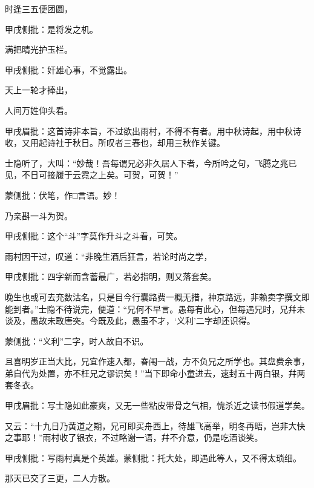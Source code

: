 \begin{poem}
    \begin{pl}时逢三五便团圆，\end{pl}\begin{note}甲戌侧批：是将发之机。\end{note}

    \begin{pl}满把晴光护玉栏。\end{pl}\begin{note}甲戌侧批：奸雄心事，不觉露出。\end{note}

    \begin{pl}天上一轮才捧出，\end{pl}

    \begin{pl}人间万姓仰头看。\end{pl}\begin{note}甲戌眉批：这首诗非本旨，不过欲出雨村，不得不有者。用中秋诗起，用中秋诗收，又用起诗社于秋日。所叹者三春也，却用三秋作关键。\end{note}
\end{poem}


\begin{parag}
    士隐听了，大叫：“妙哉！吾每谓兄必非久居人下者，今所吟之句，飞腾之兆已见，不日可接履于云霓之上矣。可贺，可贺！”\begin{note}蒙侧批：伏笔，作□言语。妙！\end{note}乃亲斟一斗为贺。\begin{note}甲戌侧批：这个“斗”字莫作升斗之斗看，可笑。\end{note}雨村因干过，叹道：“非晚生酒后狂言，若论时尚之学，\begin{note}甲戌侧批：四字新而含蓄最广，若必指明，则又落套矣。\end{note}晚生也或可去充数沽名，只是目今行囊路费一概无措，神京路远，非赖卖字撰文即能到者。”士隐不待说完，便道：“兄何不早言。愚每有此心，但每遇兄时，兄幷未谈及，愚故未敢唐突。今既及此，愚虽不才，‘义利’二字却还识得。\begin{note}蒙侧批：“义利”二字，时人故自不识。\end{note}且喜明岁正当大比，兄宜作速入都，春闱一战，方不负兄之所学也。其盘费余事，弟自代为处置，亦不枉兄之谬识矣！”当下即命小童进去，速封五十两白银，幷两套冬衣。\begin{note}甲戌眉批：写士隐如此豪爽，又无一些粘皮带骨之气相，愧杀近之读书假道学矣。\end{note}又云：“十九日乃黄道之期，兄可即买舟西上，待雄飞高举，明冬再晤，岂非大快之事耶！”雨村收了银衣，不过略谢一语，幷不介意，仍是吃酒谈笑。\begin{note}甲戌侧批：写雨村真是个英雄。蒙侧批：托大处，即遇此等人，又不得太琐细。\end{note}那天已交了三更，二人方散。
\end{parag}


